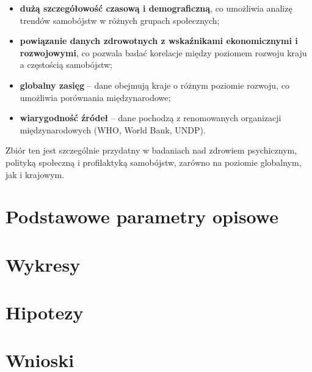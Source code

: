\documentclass[polish]{article}
\begin{document}
    \begin{itemize}
        \item \textbf{dużą szczegółowość czasową i demograficzną}, co umożliwia analizę trendów samobójstw w różnych grupach społecznych;
        \item \textbf{powiązanie danych zdrowotnych z wskaźnikami ekonomicznymi i rozwojowymi}, co pozwala badać korelacje między poziomem rozwoju kraju a częstością samobójstw;
        \item \textbf{globalny zasięg} – dane obejmują kraje o różnym poziomie rozwoju, co umożliwia porównania międzynarodowe;
        \item \textbf{wiarygodność źródeł} – dane pochodzą z renomowanych organizacji międzynarodowych (WHO, World Bank, UNDP).
    \end{itemize}

    Zbiór ten jest szczególnie przydatny w badaniach nad zdrowiem psychicznym, polityką społeczną i profilaktyką samobójstw, zarówno na poziomie globalnym, jak i krajowym.


    \newpage

    \section{Podstawowe parametry opisowe}

    \newpage

    \section{Wykresy}

    \newpage

    \section{Hipotezy}

    \newpage

    \section{Wnioski}
\end{document}
